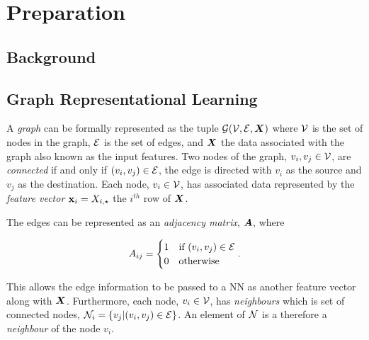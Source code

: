 \chapter{Preparation}

\section{Background}

\section{Graph Representational Learning}



A \emph{graph} can be formally represented as the tuple ${\mathcal{G}}({\mathcal{V}}, {\mathcal{E}}, {\bm{X}})$ where ${\mathcal{V}}$ is the set of nodes in the graph, ${\mathcal{E}}$ is the set of edges, and ${\bm{X}}$ the data associated with the graph also known as the input features.
Two nodes of the graph, $v_i, v_j \in {\mathcal{V}}$, are \emph{connected} if and only if $(v_i, v_j) \in {\mathcal{E}}$, the edge is directed with $v_i$ as the source and $v_j$ as the destination.
Each node, $v_i \in {\mathcal{V}}$, has associated data represented by the \emph{feature vector} ${\textbf{x}}_i = {X}_{i,\star}$ the $i^{th}$ row of ${\bm{X}}$.

The edges can be represented as an \emph{adjacency matrix}, ${\bm{A}}$, where 

\begin{equation*}
{A}_{ij} = \begin{cases}1 &\text{if $(v_i, v_j) \in {\mathcal{E}}$} \\ 0 &\text{otherwise}\end{cases}.
\end{equation*}

This allows the edge information to be passed to a NN as another feature vector along with ${\bm{X}}$.
Furthermore, each node, $v_i \in {\mathcal{V}}$, has \emph{neighbours} which is set of connected nodes, ${\mathcal{N}}_i = \{v_j | (v_i, v_j) \in {\mathcal{E}}\}$.
An element of ${\mathcal{N}}$ is a therefore a \emph{neighbour} of the node $v_i$.

